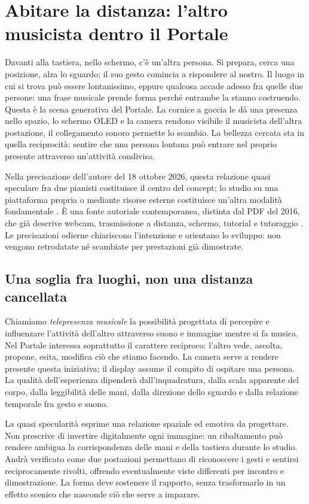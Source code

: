 \chapter{Abitare la distanza: l'altro musicista dentro il Portale}
\label{sec:originality}

Davanti alla tastiera, nello schermo, c'è un'altra persona. Si prepara, cerca una posizione, alza lo sguardo; il suo gesto comincia a rispondere al nostro. Il luogo in cui si trova può essere lontanissimo, eppure qualcosa accade adesso fra quelle due persone: una frase musicale prende forma perché entrambe la stanno costruendo. Questa è la scena generativa del Portale. La cornice a goccia le dà una presenza nello spazio, lo schermo OLED e la camera rendono visibile il musicista dell'altra postazione, il collegamento sonoro permette lo scambio. La bellezza cercata sta in quella reciprocità: sentire che una persona lontana può entrare nel proprio presente attraverso un'attività condivisa.

Nella precisazione dell'autore del 18 ottobre 2026, questa relazione quasi speculare fra due pianisti costituisce il centro del concept; lo studio su una piattaforma propria o mediante risorse esterne costituisce un'altra modalità fondamentale \cite{teleconc_terzi2026}. È una fonte autoriale contemporanea, distinta dal PDF del 2016, che già descrive webcam, trasmissione a distanza, schermo, tutorial e tutoraggio \cite[pp.~2--3]{terzi_peeragogy_2016}. Le precisazioni odierne chiariscono l'intenzione e orientano lo sviluppo: non vengono retrodatate né scambiate per prestazioni già dimostrate.

\section{Una soglia fra luoghi, non una distanza cancellata}

Chiamiamo \emph{telepresenza musicale} la possibilità progettata di percepire e influenzare l'attività dell'altro attraverso suono e immagine mentre si fa musica. Nel Portale interessa soprattutto il carattere reciproco: l'altro vede, ascolta, propone, esita, modifica ciò che stiamo facendo. La camera serve a rendere presente questa iniziativa; il display assume il compito di ospitare una persona. La qualità dell'esperienza dipenderà dall'inquadratura, dalla scala apparente del corpo, dalla leggibilità delle mani, dalla direzione dello sguardo e dalla relazione temporale fra gesto e suono.

La quasi specularità esprime una relazione spaziale ed emotiva da progettare. Non prescrive di invertire digitalmente ogni immagine: un ribaltamento può rendere ambigua la corrispondenza delle mani e della tastiera durante lo studio. Andrà verificato come due postazioni permettano di riconoscere i gesti e sentirsi reciprocamente rivolti, offrendo eventualmente viste differenti per incontro e dimostrazione. La forma deve sostenere il rapporto, senza trasformarlo in un effetto scenico che nasconde ciò che serve a imparare.

